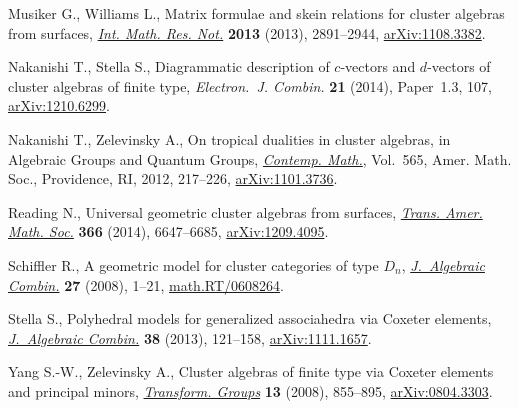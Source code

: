 \documentclass[pdftex]{sigma}
\numberwithin{equation}{section}
\begin{document}
\begin{thebibliography}{99}
Musiker G., Williams L., Matrix formulae and skein relations for cluster
 algebras from surfaces, \href{http://dx.doi.org/10.1093/imrn/rns118}{\textit{Int. Math. Res. Not.}} \textbf{2013} (2013),
 2891--2944, \href{http://arxiv.org/abs/1108.3382}{arXiv:1108.3382}.

Nakanishi T., Stella S., Diagrammatic description of {$c$}-vectors and
 {$d$}-vectors of cluster algebras of f\/inite type, \textit{Electron.~J.
 Combin.} \textbf{21} (2014), Paper~1.3, 107, \href{http://arxiv.org/abs/1210.6299}{arXiv:1210.6299}.

Nakanishi T., Zelevinsky A., On tropical dualities in cluster algebras, in
 Algebraic Groups and Quantum Groups, \href{http://dx.doi.org/10.1090/conm/565/11159}{\textit{Contemp. Math.}}, Vol.~565, Amer.
 Math. Soc., Providence, RI, 2012, 217--226, \href{http://arxiv.org/abs/1101.3736}{arXiv:1101.3736}.

Reading N., Universal geometric cluster algebras from surfaces, \href{http://dx.doi.org/10.1090/S0002-9947-2014-06156-4}{\textit{Trans.
 Amer. Math. Soc.}} \textbf{366} (2014), 6647--6685, \href{http://arxiv.org/abs/1209.4095}{arXiv:1209.4095}.

Schif\/f\/ler R., A geometric model for cluster categories of type {$D_n$},
 \href{http://dx.doi.org/10.1007/s10801-007-0071-6}{\textit{J.~Algebraic Combin.}} \textbf{27} (2008), 1--21,
 \href{http://arxiv.org/abs/math.RT/0608264}{math.RT/0608264}.

Stella S., Polyhedral models for generalized associahedra via {C}oxeter
 elements, \href{http://dx.doi.org/10.1007/s10801-012-0396-7}{\textit{J.~Algebraic Combin.}} \textbf{38} (2013), 121--158,
 \href{http://arxiv.org/abs/1111.1657}{arXiv:1111.1657}.

Yang S.-W., Zelevinsky A., Cluster algebras of f\/inite type via {C}oxeter
 elements and principal minors, \href{http://dx.doi.org/10.1007/s00031-008-9025-x}{\textit{Transform. Groups}} \textbf{13} (2008),
 855--895, \href{http://arxiv.org/abs/0804.3303}{arXiv:0804.3303}.

\end{thebibliography}\LastPageEnding

%
%
\end{document}
